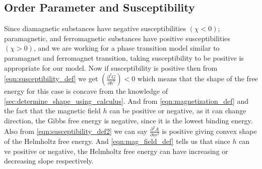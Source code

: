	\subsection{Order Parameter and Susceptibility}
	Since diamagnetic substances have negative susceptibilities $(\chi < 0)$; paramagnetic, and ferromagnetic substances have positive susceptibilities $(\chi > 0)$, and we are working for a phase transition model similar to paramagnet and ferromagnet transition, taking susceptibility to be positive is appropriate for our model. Now if susceptibility is positive then from \ref{eqn:susceptibility_def} we get $\left(\frac{\partial^2G}{\partial h ^2}\right) < 0$ which means that the shape of the free energy for this case is concave from the knowledge of \ref{sec:determine_shape_using_calculus}. And from \ref{eqn:magnetization_def} and the fact that the magnetic field $h$ can be positive or negative, as it can change direction, the Gibbs free energy is negative, since it is the lowest binding energy. \\
	Also from \ref{eqn:susceptibility_def2} we can say $\frac{\partial^2 A}{\partial m ^2}$ is positive giving convex shape of the Helmholtz free energy. And \ref{eqn:mag_field_def} tells us that since $h$ can ve positive or negative, the Helmholtz free energy can have increasing or decreasing slope respectively.
	



